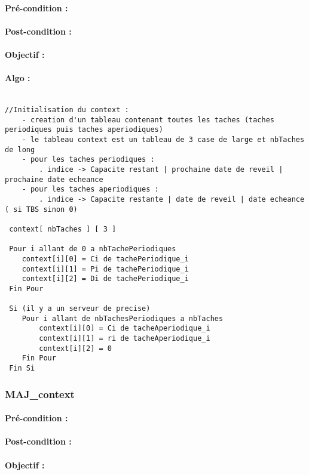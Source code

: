 				\paragraph{Pré-condition :} 
				\paragraph{Post-condition :} 
				\paragraph{Objectif :} 
				\paragraph{Algo :} 
					\begin{verbatim}

//Initialisation du context : 
 	- creation d'un tableau contenant toutes les taches (taches periodiques puis taches aperiodiques)
 	- le tableau context est un tableau de 3 case de large et nbTaches de long
 	- pour les taches periodiques :
 		. indice -> Capacite restant | prochaine date de reveil | prochaine date echeance
 	- pour les taches aperiodiques : 
 		. indice -> Capacite restante | date de reveil | date echeance ( si TBS sinon 0)
 		 
 context[ nbTaches ] [ 3 ]
 
 Pour i allant de 0 a nbTachePeriodiques
 	context[i][0] = Ci de tachePeriodique_i
 	context[i][1] = Pi de tachePeriodique_i
 	context[i][2] = Di de tachePeriodique_i
 Fin Pour
 
 Si (il y a un serveur de precise)
 	Pour i allant de nbTachesPeriodiques a nbTaches
 		context[i][0] = Ci de tacheAperiodique_i
 		context[i][1] = ri de tacheAperiodique_i
 		context[i][2] = 0 
 	Fin Pour
 Fin Si
					\end{verbatim}			
					
			\subsubsection{MAJ\_context}
				\paragraph{Pré-condition :} 
				\paragraph{Post-condition :} 
				\paragraph{Objectif :} 
